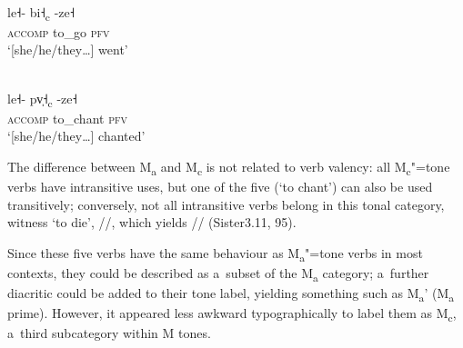 \begin{exe}
	\ex
	\label{ex:went}
	\\
	\gll le˧-		bi˧\textsubscript{c}	-ze˧\\
	\textsc{accomp}		to\_go	\textsc{pfv}\\
	\glt ‘[she/he/they{\dots}] went’
\end{exe}



\begin{exe}
	\ex
	\label{ex:prayed}
	\\
	\gll le˧-		pv̩˧\textsubscript{c}	-ze˧\\
	\textsc{accomp}		to\_chant	\textsc{pfv}\\
	\glt ‘[she/he/they{\dots}] chanted’
\end{exe}

The difference between M\textsubscript{a} and M\textsubscript{c} is not related to verb valency: all M\textsubscript{c}"=tone verbs have intransitive uses, but one of the five (‘to chant’) can also be used transitively; conversely, not all intransitive verbs belong in this tonal category, witness ‘to die’, //, which yields // (Sister3.11, 95).

Since these five verbs have the same behaviour as M\textsubscript{a}"=tone verbs in most contexts, they could be described as a~subset of the M\textsubscript{a} category; a~further diacritic could be added to their tone
label, yielding something such as M\textsubscript{a}’ (M\textsubscript{a} prime). However, it appeared less awkward typographically
to label them as M\textsubscript{c}, a~third subcategory within M tones. 

